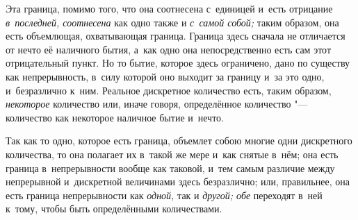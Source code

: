 Эта граница, помимо того, что она соотнесена с~единицей и~есть отрицание
{\em в~последней, соотнесена} как одно также и {\em с~самой собой;} таким
образом, она есть объемлющая, охватывающая граница. Граница здесь сначала не
отличается от нечто её наличного бытия, а~как одно она непосредственно
есть сам этот отрицательный пункт. Но то бытие, которое здесь ограничено, дано
по существу как непрерывность, в~силу которой оно выходит за границу и~за это
одно, и~безразлично к~ним. Реальное дискретное количество есть, таким образом,
{\em некоторое} количество или, иначе говоря, определённое количество "---
количество как некоторое наличное бытие и~нечто.

Так как то одно, которое есть граница, объемлет собою многие одни дискретного
количества, то она полагает их в~такой же мере и~как снятые в~нём; она есть
граница в~непрерывности вообще как таковой, и~тем самым различие между
непрерывной и~дискретной величинами здесь безразлично; или, правильнее, она
есть граница непрерывности как {\em одной,} так и {\em другой; обе} переходят
в~ней к~тому, чтобы быть определёнными количествами.

\bigskip
